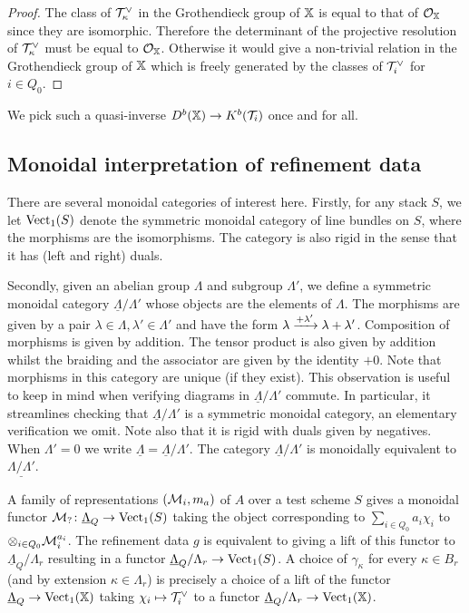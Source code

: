 \documentclass[12pt]{amsart}
\begin{document}
\begin{proof}
The class of $\mathcal{T}_\kappa^\vee$ in the Grothendieck group of $\mathbb{X}$ is equal to that of $\mathcal{O}_{\mathbb{X}}$ since they are isomorphic.
Therefore the determinant of the projective resolution of $\mathcal{T}_\kappa^\vee$ must be equal to $\mathcal{O}_{\mathbb{X}}$. 
Otherwise it would give a non-trivial relation in the Grothendieck group of $\mathbb{X}$ which is freely generated by the classes of $\mathcal{T}_i^\vee$ for $i\in Q_0$.
\end{proof}

We pick such a quasi-inverse $D^b(\mathbb{X}) \rightarrow K^b(\mathcal{T}_i)$ once and for all.

\subsection{Monoidal interpretation of refinement data}
There are several monoidal categories of interest here. 
Firstly, for any stack $S$, we let $\operatorname{Vect}_1 (S)$ denote the symmetric monoidal category of line bundles on $S$, where the morphisms are the isomorphisms. 
The category is also rigid in the sense that it has (left and right) duals. 

Secondly, given an abelian group $\Lambda$ and subgroup $\Lambda'$, we define a symmetric monoidal category $\underline{\Lambda}/\Lambda'$ whose objects are the elements of $\Lambda$.
The morphisms are given by a pair $\lambda \in \Lambda, \lambda' \in \Lambda'$ and have the form $\lambda \xrightarrow{+\lambda'} \lambda + \lambda'$. 
Composition of morphisms is given by addition. The tensor product is also given by addition whilst the braiding and the associator are given by the identity $+0$. Note that morphisms in this category are unique (if they exist). 
This observation is useful to keep in mind when verifying diagrams in $\underline{\Lambda}/\Lambda'$ commute. 
In particular, it streamlines checking that $\underline{\Lambda}/\Lambda'$ is a symmetric monoidal category, an elementary verification we omit. Note also that it is rigid with duals given by negatives.
When $\Lambda' = 0$ we write $\underline{\Lambda} = \underline{\Lambda}/\Lambda'$.
The category $\underline{\Lambda}/\Lambda'$ is monoidally equivalent to $\underline{\Lambda/\Lambda'}$.

A family of representations $(\mathcal{M}_i,  m_a)$ of $A$ over a test scheme $S$ gives a monoidal functor $\mathcal{M}_? \colon\underline{\Lambda}_{Q} \rightarrow \operatorname{Vect}_1(S)$ taking the object corresponding to $\sum_{i \in Q_0} a_i \chi_i$ to $\otimes_{i \in Q_0} \mathcal{M}_i^{a_i}$.
The refinement data $g$ is equivalent to giving a lift of this functor to $\underline{\Lambda}_{Q}/\Lambda_r$ resulting in a functor $\underline{\Lambda}_{Q}/\Lambda_r \rightarrow \operatorname{Vect}_1(S)$.
A choice of $\gamma_\kappa$ for every $\kappa \in B_r$ (and by extension $\kappa \in \Lambda_r$) is precisely a choice of a lift of the functor $\underline{\Lambda}_{Q} \rightarrow \operatorname{Vect}_1(\mathbb{X})$ taking $\chi_i \mapsto \mathcal{T}_i^\vee$ to a functor $\underline{\Lambda}_{Q}/\Lambda_r \rightarrow \operatorname{Vect}_1(\mathbb{X})$.
\end{document}
